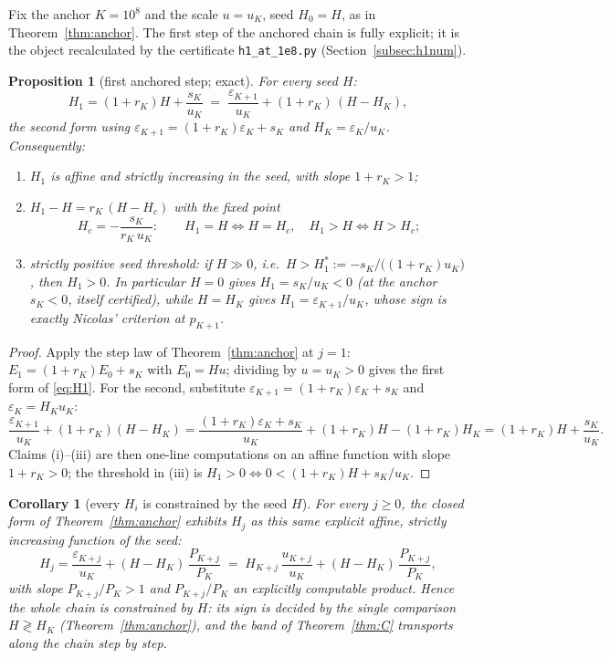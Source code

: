 \documentclass[11pt]{article}
\newtheorem{proposition}[theorem]{Proposition}
\newtheorem{corollary}[theorem]{Corollary}
\theoremstyle{remark}
\newcommand{\eps}{\varepsilon}
\begin{document}
Fix the anchor $K=10^8$ and the scale $u=u_K$, seed $H_0=H$, as in
Theorem~\ref{thm:anchor}. The first step of the anchored chain is fully
explicit; it is the object recalculated by the certificate
\texttt{h1\_at\_1e8.py} (Section~\ref{subsec:h1num}).

\begin{proposition}[first anchored step; exact]\label{prop:h1}
For every seed $H$:
\begin{equation}\label{eq:H1}
H_1=(1+r_K)H+\frac{s_K}{u_K}
\;=\;\frac{\eps_{K+1}}{u_K}+(1+r_K)\,(H-H_K),
\end{equation}
the second form using $\eps_{K+1}=(1+r_K)\eps_K+s_K$ and $H_K=\eps_K/u_K$.
Consequently:
\begin{enumerate}
\item $H_1$ is affine and strictly increasing in the seed, with slope
$1+r_K>1$;
\item $H_1-H=r_K\,(H-H_c)$ with the \emph{fixed point}
\[\displaystyle H_c=-\frac{s_K}{r_K\,u_K}:\qquad
H_1=H\iff H=H_c,\quad H_1>H\iff H>H_c;\]
\item strictly positive seed threshold: if $H\gg0$, i.e.\
$H>H_1^{*}:=-s_K/\bigl((1+r_K)u_K\bigr)$, then $H_1>0$. In particular
$H=0$ gives $H_1=s_K/u_K<0$ (at the anchor $s_K<0$, itself certified), while
$H=H_K$ gives $H_1=\eps_{K+1}/u_K$, whose sign is exactly Nicolas'
criterion at $p_{K+1}$.
\end{enumerate}
\end{proposition}

\begin{proof}
Apply the step law of Theorem~\ref{thm:anchor} at $j=1$:
$E_1=(1+r_K)E_0+s_K$ with $E_0=Hu$; dividing by $u=u_K>0$ gives the first
form of \eqref{eq:H1}. For the second, substitute
$\eps_{K+1}=(1+r_K)\eps_K+s_K$ and $\eps_K=H_Ku_K$:
\[
\frac{\eps_{K+1}}{u_K}+(1+r_K)(H-H_K)
=\frac{(1+r_K)\eps_K+s_K}{u_K}+(1+r_K)H-(1+r_K)H_K
=(1+r_K)H+\frac{s_K}{u_K} .
\]
Claims (i)--(iii) are then one-line computations on an affine function with
slope $1+r_K>0$; the threshold in (iii) is $H_1>0\iff 0<(1+r_K)H+s_K/u_K$.
\end{proof}

\begin{corollary}[every $H_i$ is constrained by the seed $H$]\label{cor:seed}
For every $j\ge0$, the closed form of Theorem~\ref{thm:anchor} exhibits
$H_j$ as this same explicit affine, strictly increasing function of the seed:
\[
H_j=\frac{\eps_{K+j}}{u_K}+(H-H_K)\,\frac{P_{K+j}}{P_K}
\;=\;H_{K+j}\,\frac{u_{K+j}}{u_K}+(H-H_K)\,\frac{P_{K+j}}{P_K},
\]
with slope $P_{K+j}/P_K>1$ and $P_{K+j}/P_K$ an explicitly computable
product. Hence the whole chain is constrained by $H$: its sign is decided by
the single comparison $H\gtrless H_K$ (Theorem~\ref{thm:anchor}), and the
band of Theorem~\ref{thm:C} transports along the chain step by step.
\end{corollary}
\end{document}
